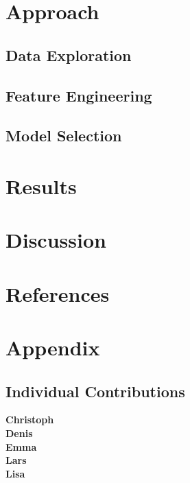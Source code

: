 \documentclass[a4paper]{article}
\begin{document}
\section{Approach}


\subsection{Data Exploration}




\subsection{Feature Engineering}




\subsection{Model Selection}



\section{Results}




\section{Discussion}




\section{References}


\section*{Appendix}


\subsection*{Individual Contributions}


\textbf{Christoph}\\




\textbf{Denis}\\



\textbf{Emma}\\



\textbf{Lars}\\



\textbf{Lisa}\\
\end{document}
